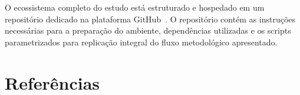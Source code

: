 \documentclass[12pt]{article}
\begin{document}
O ecossistema completo do estudo está estruturado e hospedado em um repositório dedicado na plataforma GitHub~\cite{barreto_matos_github_2026}. O repositório contém as instruções necessárias para a preparação do ambiente, dependências utilizadas e os scripts parametrizados para replicação integral do fluxo metodológico apresentado.








\section{Referências}

{
  \renewcommand{\section}[2]{}%
  
  
}
\end{document}
